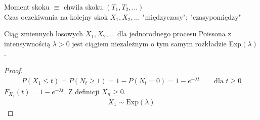 Moment skoku $ \equiv $ chwila skoku $ \left(T_1,T_2,\dots \right) $\\
Czas oczekiwania na kolejny skok $ X_1,X_2,\dots  $ "międzyczasy"; "czasypomiędzy"
\begin{twr}
Ciąg zmiennych losowych $ X_1,X_2,\dots$ dla jednorodnego procesu Poissona z intensywnością $ \lambda>0 $ jest ciągiem niezależnym o tym samym rozkładzie Exp$ \left(\lambda\right) $.
\begin{proof}
\begin{gather*}
P\left(X_1\le t\right)
=
P\left(N_t\ge 1\right)
=
1-P\left(N_t=0\right)
=
1-e^{-\lambda t}\qquad\text{dla }t\ge 0
\end{gather*}
$ F_{X_1}(t)=1-e^{-\lambda t} $. Z definicji $ X_n\ge 0 $.
\begin{gather*}
X_1\sim\text{Exp}\left(\lambda\right)
\end{gather*}
\end{proof}
\end{twr}